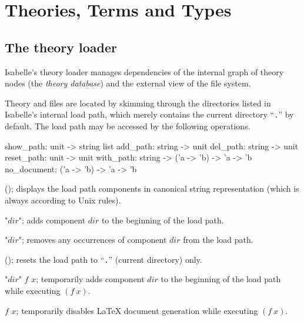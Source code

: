 
\chapter{Theories, Terms and Types} \label{theories}

\section{The theory loader}\label{sec:more-theories}

Isabelle's theory loader manages dependencies of the internal graph of theory
nodes (the \emph{theory database}) and the external view of the file system.

\medskip Theory and {\ML} files are located by skimming through the
directories listed in Isabelle's internal load path, which merely contains the
current directory ``\texttt{.}'' by default.  The load path may be accessed by
the following operations.

\begin{ttbox}
show_path: unit -> string list
add_path: string -> unit
del_path: string -> unit
reset_path: unit -> unit
with_path: string -> ('a -> 'b) -> 'a -> 'b
no_document: ('a -> 'b) -> 'a -> 'b
\end{ttbox}

\begin{ttdescription}
\item[\ttindexbold{show_path}();] displays the load path components in
  canonical string representation (which is always according to Unix rules).
  
\item[\ttindexbold{add_path} "$dir$";] adds component $dir$ to the beginning
  of the load path.
  
\item[\ttindexbold{del_path} "$dir$";] removes any occurrences of component
  $dir$ from the load path.
  
\item[\ttindexbold{reset_path}();] resets the load path to ``\texttt{.}''
  (current directory) only.
  
\item[\ttindexbold{with_path} "$dir$" $f$ $x$;] temporarily adds component
  $dir$ to the beginning of the load path while executing $(f~x)$.
  
\item[\ttindexbold{no_document} $f$ $x$;] temporarily disables {\LaTeX}
  document generation while executing $(f~x)$.

\end{ttdescription}

